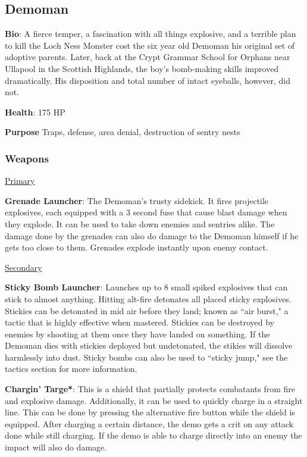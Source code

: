 \subsection{Demoman}
\label{Demoman}
{\bf Bio}:
A fierce temper, a fascination with all things explosive, and a terrible plan to kill the Loch Ness Monster cost the six year old Demoman his original set of adoptive parents. Later, back at the Crypt Grammar School for Orphans near Ullapool in the Scottish Highlands, the boy's bomb-making skills improved dramatically. His disposition and total number of intact eyeballs, however, did not.

{\bf Health}: 175 HP

{\bf Purpose}
Traps, defense, area denial, destruction of sentry nests

\subsubsection {Weapons}


\begin {center}
\underline {Primary}
\end {center}

{\bf Grenade Launcher}: The Demoman's trusty sidekick. It fires projectile explosives, each equipped with a 3 second fuse that cause blast damage when they explode. It can be used to take down enemies and sentries alike. The damage done by the grenades can also do damage to the Demoman himself if he gets too close to them. Grenades explode instantly upon enemy contact.

\begin {center}
\underline {Secondary}
\end {center}

{\bf Sticky Bomb Launcher}: Launches up to 8 small spiked explosives that can stick to almost anything. Hitting alt-fire detonates all placed sticky explosives. Stickies can be detonated in mid air before they land; known as ``air burst," a tactic that is highly effective when mastered. Stickies can be destroyed by enemies by shooting at them once they have landed on something. If the Demoman dies with stickies deployed but undetonated, the stikies will dissolve harmlessly into dust. Sticky bombs can also be used to ``sticky jump," see the tactics section for more information. 

{\bf Chargin' Targe*}: This is a shield that partially protects combatants from fire and explosive damage. Additionally, it can be used to quickly charge in a straight line. This can be done by pressing the alternative fire button while the shield is equipped. After charging a certain distance, the demo gets a crit on any attack done while still charging. If the demo is able to charge directly into an enemy the impact will also do damage.

